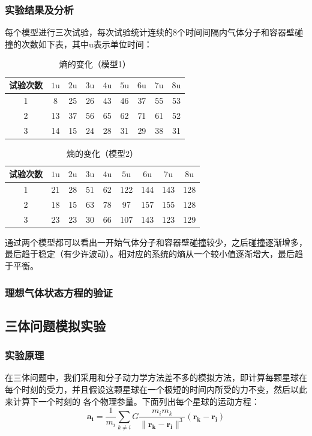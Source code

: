 ﻿\documentclass{article}
\begin{document}
	\subsubsection*{实验结果及分析}
	每个模型进行三次试验，每次试验统计连续的8个时间间隔内气体分子和容器壁碰撞的次数如下表，其中$\mathrm{u}$表示单位时间：
	\begin{table}[H]
		\centering
		\caption{\label{tab:a}熵的变化（模型1）}
		\begin{tabular}{ccccccccc}
			\toprule
			试验次数 & $1\mathrm{u}$ & $2\mathrm{u}$ & $3\mathrm{u}$ & $4\mathrm{u}$ & $5\mathrm{u}$ & $6\mathrm{u}$ & $7\mathrm{u}$ & $8\mathrm{u}$\\
			\midrule
			1 &   8  & 25 & 26 & 43 & 46 & 37 & 55 & 53 \\
			2 &   13 & 37 & 56 & 65 & 62 & 71 & 61 & 52 \\
			3 &   14 & 15 & 24 & 28 & 31 & 29 & 38 & 31 \\
			\bottomrule
		\end{tabular}
	\end{table}
	\begin{table}[H]
		\centering
		\caption{\label{tab:a}熵的变化（模型2）}
		\begin{tabular}{ccccccccc}
			\toprule
			试验次数 & $1\mathrm{u}$ & $2\mathrm{u}$ & $3\mathrm{u}$ & $4\mathrm{u}$ & $5\mathrm{u}$ & $6\mathrm{u}$ & $7\mathrm{u}$ & $8\mathrm{u}$\\
			\midrule
			1 &   21 & 28 & 51 & 62 & 122 & 144 & 143 & 128 \\
			2 &   18 & 15 & 63 & 78 & 97 & 157 & 155 & 128 \\
			3 &   23 & 23 & 30 & 66 & 107 & 143 & 123 & 129 \\
			\bottomrule
		\end{tabular}
	\end{table}
	通过两个模型都可以看出一开始气体分子和容器壁碰撞较少，之后碰撞逐渐增多，最后趋于稳定（有少许波动）。相对应的系统的熵从一个较小值逐渐增大，最后趋于平衡。
	\subsubsection{理想气体状态方程的验证}
	\subsection{三体问题模拟实验}
	\subsubsection{实验原理}
	在三体问题中，我们采用和分子动力学方法差不多的模拟方法，即计算每颗星球在每个时刻的受力，并且假设这颗星球在一个极短的时间内所受的力不变，然后以此来计算下一个时刻的
	各个物理参量。下面列出每个星球的运动方程：
	\[\mathbf{a_i} = \frac{1}{m_i}\sum_{k \neq i} G\frac{m_im_k}{\lVert \mathbf{r_k} - \mathbf{r_i} \rVert^3}(\mathbf{r_k} - \mathbf{r_i})\]
\end{document}

